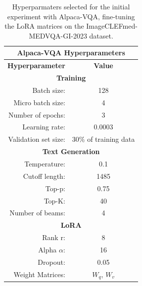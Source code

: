     \begin{table}[htb]
    \centering
    \begin{tabular}{ r r c } 
         \multicolumn{3}{c}{\textbf{Alpaca-VQA Hyperparameters}}\\
        \toprule
           \multicolumn{2}{c}{\textbf{Hyperparameter}} & \textbf{Value}\\ 
        \midrule
            \multicolumn{3}{c}{\textbf{Training}}\\
            
            \multicolumn{2}{r}{Batch size:} & 128 \\
            \multicolumn{2}{r}{Micro batch size:} & 4 \\
            \multicolumn{2}{r}{Number of epochs:}& 3 \\
            \multicolumn{2}{r}{Learning rate:} & 0.0003 \\ 
            \multicolumn{2}{r}{Validation set size:} & 30\% of training data\\
        \midrule
            \multicolumn{3}{c}{\textbf{Text Generation}}\\
            \multicolumn{2}{r}{Temperature:} & 0.1\\
             \multicolumn{2}{r}{Cutoff length:} & 1485 \\
            \multicolumn{2}{r}{Top-p:} & 0.75\\
            \multicolumn{2}{r}{Top-K:} & 40\\
            \multicolumn{2}{r}{Number of beams:} & 4\\
        \midrule
            \multicolumn{3}{c}{\textbf{LoRA}}\\
            \multicolumn{2}{r}{Rank r:} & 8 \\
            \multicolumn{2}{r}{Alpha $\alpha$:} & 16 \\
            \multicolumn{2}{r}{Dropout:} & 0.05 \\
            \multicolumn{2}{r}{Weight Matrices:} & $W_q$, $W_v$ \\[0.5ex]
        \bottomrule
    \end{tabular}
    \caption[Hyperparameters used for Alpaca-VQA.]{Hyperparmaters selected for the initial experiment with Alpaca-VQA, fine-tuning the LoRA matrices on the ImageCLEFmed-MEDVQA-GI-2023 dataset.}
    \label{table:hyperparameters_alpaca}
    \end{table}

